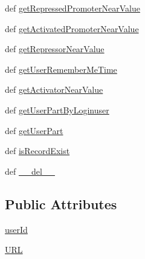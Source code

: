 \begin{DoxyCompactItemize}
\item 
def \hyperlink{classweb_1_1database_1_1_sqlite_database_ad9fa566c6ea0c8fa75d402bd1502f38b}{get\-Repressed\-Promoter\-Near\-Value}
\item 
def \hyperlink{classweb_1_1database_1_1_sqlite_database_aa3bd1c42a4c0f6b02b88997ba4a93b10}{get\-Activated\-Promoter\-Near\-Value}
\item 
def \hyperlink{classweb_1_1database_1_1_sqlite_database_acc8b22451ed67b7cef441a410579c8fc}{get\-Repressor\-Near\-Value}
\item 
def \hyperlink{classweb_1_1database_1_1_sqlite_database_a0a1547b97144bbf9fdea490387d7e4f8}{get\-User\-Remember\-Me\-Time}
\item 
def \hyperlink{classweb_1_1database_1_1_sqlite_database_a946b12e6b15ea6dffbcaa453818bbedd}{get\-Activator\-Near\-Value}
\item 
def \hyperlink{classweb_1_1database_1_1_sqlite_database_aac6cf2ce78b08436e1c44cc979d06225}{get\-User\-Part\-By\-Loginuser}
\item 
def \hyperlink{classweb_1_1database_1_1_sqlite_database_a62261b89a196a4b1b2b9a1a016925789}{get\-User\-Part}
\item 
def \hyperlink{classweb_1_1database_1_1_sqlite_database_a529d46c1b86c6e2f3ecbb773c552e085}{is\-Record\-Exist}
\item 
def \hyperlink{classweb_1_1database_1_1_sqlite_database_af74c7257253d78463e50fec22594a023}{\-\_\-\-\_\-del\-\_\-\-\_\-}
\end{DoxyCompactItemize}
\subsection*{Public Attributes}
\begin{DoxyCompactItemize}
\item 
\hyperlink{classweb_1_1database_1_1_sqlite_database_ad4ed7fe25d1d69bb149e881715af580a}{user\-Id}
\item 
\hyperlink{classweb_1_1database_1_1_sqlite_database_af0fe8bdf0c15d77b821281a86e49bd81}{U\-R\-L}
\end{DoxyCompactItemize}
